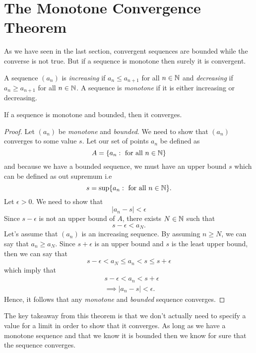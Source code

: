 \section{The Monotone Convergence Theorem}

As we have seen in the last section, convergent sequences are bounded while the converse is not true. But if a sequence is monotone then surely it is convergent. 

\begin{definition}
    A sequence \( (a_n) \) is \textit{increasing } if \( a_n \leq a_{n+1}\) for all \( n \in \mathbb{N} \) and \textit{decreasing} if \( a_n \geq a_{n+1}\) for all \( n \in \mathbb{N} \). A sequence is \textit{monotone} if it is either increasing or decreasing.
\end{definition}%
\begin{theorem}
        If a sequence is monotone and bounded, then it converges.
    \end{theorem}%

\begin{proof}
Let \( (a_n)\) be \textit{monotone} and \textit{bounded}. We need to show that \( (a_n)\) converges to some value \( s \). Let our set of points \( a_n\) be defined as 
\[ A = \{ a_n : \text{ for all } n \in \mathbb{N}  \}\] 
and because we have a bounded sequence, we must have an upper bound \( s \) which can be defined as out supremum i.e
\[ s = \sup \{ a_n : \text{ for all } n \in \mathbb{N}  \}.\]
Let \( \epsilon > 0 \). We need to show that 
\[ |a_n - s| < \epsilon \] 
Since \( s - \epsilon  \) is not an upper bound of \( A \), there exists \( N \in \mathbb{N} \) such that 
\[ s - \epsilon < a_N.\]
Let's assume that \( (a_n)\) is an increasing sequence. By assuming \(n \geq N \), we can say that \( a_n \geq a_N\). Since \( s + \epsilon \) is an upper bound and \( s \) is the least upper bound, then we can say that  
\[ s - \epsilon < a_N \leq a_n < s \leq s + \epsilon \]
which imply that 
\begin{align*}
    &s - \epsilon  <  a_n < s + \epsilon  \\
    &\implies |a_n - s| < \epsilon.  
\end{align*}
Hence, it follows that any \textit{monotone} and \textit{bounded} sequence converges.
\end{proof}

The key takeaway from this theorem is that we don't actually need to specify a value for a limit in order to show that it converges. As long as we have a monotone sequence and that we know it is bounded then we know for sure that the sequence converges.

